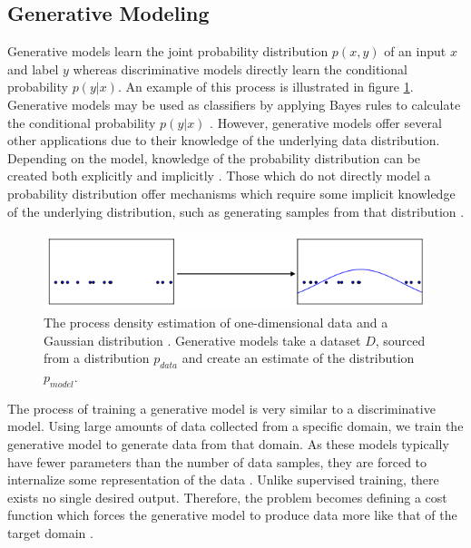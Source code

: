 \documentclass[11pt]{article}
\begin{document}
\subsection{Generative Modeling}
Generative models learn the joint probability distribution $p(x,y)$ of an input $x$ and label $y$ whereas discriminative models directly learn the conditional probability $p(y|x)$. An example of this process is illustrated in figure \ref{fig:pdf}. Generative models may be used as classifiers by applying Bayes rules to calculate the conditional probability $p(y|x)$ \citep{NIPS2001_2020}. However, generative models offer several other applications due to their knowledge of the underlying data distribution. Depending on the model, knowledge of the probability distribution can be created both explicitly and implicitly \citep{Goodfellow-et-al-2016}. Those which do not directly model a probability distribution offer mechanisms which require some implicit knowledge of the underlying distribution, such as generating samples from that distribution \citep{Goodfellow-et-al-2016}.

\begin{figure}
\centering
\includegraphics[scale=0.7]{pdf}
\caption{The process density estimation of one-dimensional data and a Gaussian distribution \citep{2017arXiv170100160G}. Generative models take a dataset $D$, sourced from a distribution $p_{data}$ and create an estimate of the distribution $p_{model}$.}
\label{fig:pdf}
\end{figure}

The process of training a generative model is very similar to a discriminative model. Using large amounts of data collected from a specific domain, we train the generative model to generate data from that domain. As these models typically have fewer parameters than the number of data samples, they are forced to internalize some representation of the data \citep{genmodelingopenai}. Unlike supervised training, there exists no single desired output. Therefore, the problem becomes defining a cost function which forces the generative model to produce data more like that of the target domain \citep{genmodelingopenai}.
\end{document}
